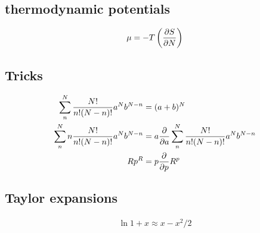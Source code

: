 \documentclass[a4paper, norsk, 8pt]{article}
\begin{document}
\begin{multicols*}{3}
\subsection*{\footnotesize  thermodynamic potentials}
\begin{equation}
  \mu = -T\left( \pdv{S}{N} \right)
\end{equation}
\subsection*{\footnotesize  Tricks}
\begin{align*}
  \sum_{n}^{N} \frac{N!}{n!(N-n)!}a^Nb^{N-n} &= (a+b)^N \\
  \sum_{n}^{N} n\frac{N!}{n!(N-n)!}a^Nb^{N-n} &= a\pdv{}{a}\sum_{n}^{N} \frac{N!}{n!(N-n)!}a^Nb^{N-n} \\
  Rp^{R} &= p \pdv{}{p}R^{p}
\end{align*}

\subsection*{\footnotesize  Taylor expansions}
\begin{align*}
  \ln{1+x} \approx x - x^2/2
\end{align*}

\end{multicols*}
\end{document}
